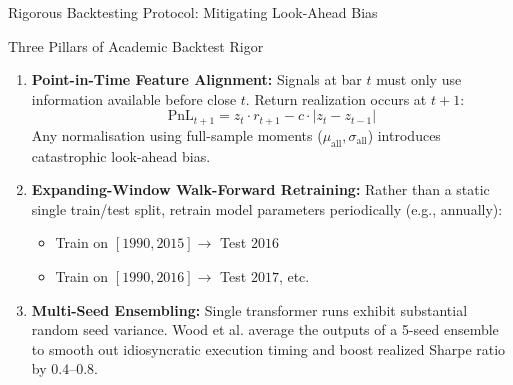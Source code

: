 \documentclass[10pt]{beamer}
\begin{document}
\begin{frame}{Rigorous Backtesting Protocol: Mitigating Look-Ahead Bias}
  \begin{block}{Three Pillars of Academic Backtest Rigor}
    \begin{enumerate}\scriptsize
      \item \textbf{Point-in-Time Feature Alignment:}
      Signals at bar $t$ must only use information available before close $t$. Return realization occurs at $t+1$:
      \begin{equation*}
        \text{PnL}_{t+1} = z_t \cdot r_{t+1} - c \cdot |z_t - z_{t-1}|
      \end{equation*}
      Any normalisation using full-sample moments ($\mu_{\text{all}}, \sigma_{\text{all}}$) introduces catastrophic look-ahead bias.
      \item \textbf{Expanding-Window Walk-Forward Retraining:}
      Rather than a static single train/test split, retrain model parameters periodically (e.g., annually):
      \begin{itemize}\tiny
        \item Train on $[1990, 2015] \to$ Test $2016$
        \item Train on $[1990, 2016] \to$ Test $2017$, etc.
      \end{itemize}
      \item \textbf{Multi-Seed Ensembling:}
      Single transformer runs exhibit substantial random seed variance. Wood et al. average the outputs of a 5-seed ensemble to smooth out idiosyncratic execution timing and boost realized Sharpe ratio by $0.4$--$0.8$.
    \end{enumerate}
  \end{block}
\end{frame}
\end{document}
